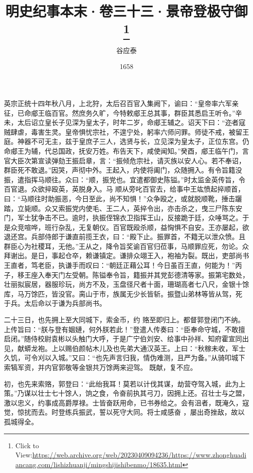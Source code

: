 \documentclass{article}
\title{明史纪事本末·卷三十三·景帝登极守御\footnote{Click to View:\url{https://web.archive.org/web/20230409094236/https://www.zhonghuadiancang.com/lishizhuanji/mingshijishibenmo/18635.html}}}
\author{谷应泰}
\date{1658}
\begin{document}

\maketitle


\Large

﻿英宗正统十四年秋八月，上北狩，太后召百官入集阙下，谕曰：“皇帝率六军亲征，已命郕王临百官。然庶务久旷，今特敕郕王总其事，群臣其悉启王听令。”辛未，太后诏立皇长子见深为皇太子，时年二岁，命郕王辅之。诏天下曰：“迩者寇贼肆虐，毒害生灵。皇帝惧忧宗社，不遑宁处，躬率六师问罪。师徒不戒，被留王庭。神器不可无主，兹于皇庶子三人，选贤与长，立见深为皇太子，正位东宫。仍命郕王为辅，代总国政，抚安万姓。布告天下，咸使闻知。”癸酉，郕王临午门，言官大臣次第宣读弹劾王振启章，言：“振倾危宗社，请灭族以安人心。若不奉诏，群臣死不敢退。”因哭，声彻中外。王起入，内使将阖门，众随拥入。有令旨籍没振，遣指挥马顺往。众曰：“顺，振党也。宜遣都御史陈镒。”时太监金英传旨，令百官退。众欲捽殴英，英脱身入。马
\newpage
顺从旁叱百官去，给事中王竑愤起捽顺首，曰：“马顺往时助振恶，今日至此，尚不知惧！”众争殴之，或就脱顺靴，捶击躧踏，立毙顺。众又索振党内使毛、王二人，英捽令出，亦击杀之，曳三尸陈东安门，军士犹争击不已。逾时，执振侄锦衣卫指挥王山，反接跪于廷，众唾骂之。于是众竞喧哗，班行杂乱，无复朝仪。百官既殴杀顺，益恟惧不自安。王亦屡起，欲退还宫。兵部侍郎于谦直前揽王衣，曰：“殿下止。振罪首，不籍无以泄众愤。且群臣心为社稷耳，无他。”王从之，降令旨奖谕百官归莅事，马顺罪应死，勿论。众拜谢出。是日，事起仓卒，赖谦镇定。谦排众翊王入，袍袖为裂。既出，吏部尚书王直者，笃老臣，执谦手而叹曰：“朝廷正藉公耳！今日虽百王直，何能为！”丙子，移王座入奉天门左受朝。陈镒奉令旨，籍振并其党彭德清等家。振第宅数处，壮丽拟宸居，器服珍玩，尚方不及，玉盘径尺者十面，珊瑚高者七八尺，金银十馀库，马万馀匹，皆没官。脔山于市，族属无少长皆斩。振暨山弟林等皆从驾，死
于兵。太后命以于谦为兵部尚书。 

二十三日，也先拥上至大同城下，索金币，约
\newpage
赂至即归上。都督郭登闭门不纳。上传旨曰：“朕与登有姻㜕，何外朕若此！”登遣人传奏曰：“臣奉命守城，不敢擅启闭。”随侍校尉袁彬以头触门大呼，于是广宁伯刘安、给事中孙祥、知府霍宣同出见，献蟒龙袍。上以赐伯颜帖木儿及也先弟大通汉英王。上曰：“秋稼未收，军士久饥，可令刈以入城。”又曰：“也先声言归我，情伪难测，且严为备。”从骑叩城下索犒军资，并内官郭敬等金银共万馀两来迎驾。
既献，复不应。 

初，也先来索赂，郭登曰：“此绐我耳！莫若以计伐其谋，劫营夺驾入城，此为上策。”乃谋以壮士七十馀人，饷之食，令奋前执其弓刀，因拥上还。召壮士与之盟，激以忠义，约事成高爵厚禄。士皆奋跃用命，已书券给之。会有沮者，既淹久，寇觉，惊扰而去。时登练兵振武，誓以死守大同。将士咸感奋
，屡出奇挫敌，故以孤城得全。 
\end{document}
